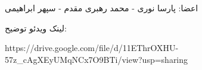 \documentclass[12pt,a4paper]{article}
\begin{document}

اعضا: پارسا نوری - محمد رهبری مقدم - سپهر ابراهیمی


لینک ویدئو توضیح:
\newline
\begin{latin}
    https://drive.google.com/file/d/11EThrOXHU-57z_cAgXEyUMqNCx7O9BTi/view?usp=sharing
\end{latin}











\newpage




   
\end{document}
